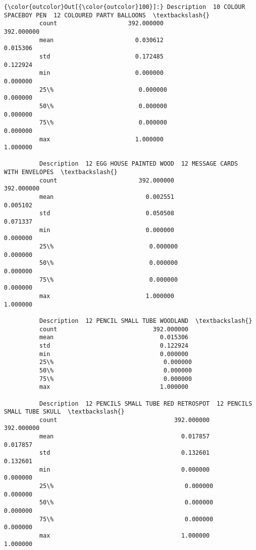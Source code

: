 \documentclass[11pt]{article}
\begin{document}
\begin{Verbatim}[commandchars=\\\{\}]
{\color{outcolor}Out[{\color{outcolor}100}]:} Description  10 COLOUR SPACEBOY PEN  12 COLOURED PARTY BALLOONS  \textbackslash{}
          count                    392.000000                  392.000000   
          mean                       0.030612                    0.015306   
          std                        0.172485                    0.122924   
          min                        0.000000                    0.000000   
          25\%                        0.000000                    0.000000   
          50\%                        0.000000                    0.000000   
          75\%                        0.000000                    0.000000   
          max                        1.000000                    1.000000   
          
          Description  12 EGG HOUSE PAINTED WOOD  12 MESSAGE CARDS WITH ENVELOPES  \textbackslash{}
          count                       392.000000                       392.000000   
          mean                          0.002551                         0.005102   
          std                           0.050508                         0.071337   
          min                           0.000000                         0.000000   
          25\%                           0.000000                         0.000000   
          50\%                           0.000000                         0.000000   
          75\%                           0.000000                         0.000000   
          max                           1.000000                         1.000000   
          
          Description  12 PENCIL SMALL TUBE WOODLAND  \textbackslash{}
          count                           392.000000   
          mean                              0.015306   
          std                               0.122924   
          min                               0.000000   
          25\%                               0.000000   
          50\%                               0.000000   
          75\%                               0.000000   
          max                               1.000000   
          
          Description  12 PENCILS SMALL TUBE RED RETROSPOT  12 PENCILS SMALL TUBE SKULL  \textbackslash{}
          count                                 392.000000                   392.000000   
          mean                                    0.017857                     0.017857   
          std                                     0.132601                     0.132601   
          min                                     0.000000                     0.000000   
          25\%                                     0.000000                     0.000000   
          50\%                                     0.000000                     0.000000   
          75\%                                     0.000000                     0.000000   
          max                                     1.000000                     1.000000   
          

\end{Verbatim}
\end{document}
